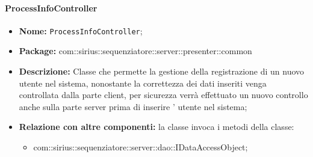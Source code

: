 \paragraph{ProcessInfoController}
	\begin{itemize}
		\item \textbf{Nome:} \texttt{ProcessInfoController};
		\item \textbf{Package:} com::sirius::sequenziatore::server::presenter::common
		\item \textbf{Descrizione:} Classe che permette la gestione della registrazione di un nuovo utente nel sistema, nonostante la correttezza dei dati inseriti venga controllata dalla parte client, per sicurezza verrà effettuato un nuovo controllo anche sulla parte server prima di inserire ' utente nel sistema;
		\item \textbf{Relazione con altre componenti:} la classe invoca i metodi della classe:
		\begin{itemize}
			\item com::sirius::sequenziatore::server::dao::IDataAccessObject;
		\end{itemize}
	\end{itemize}

